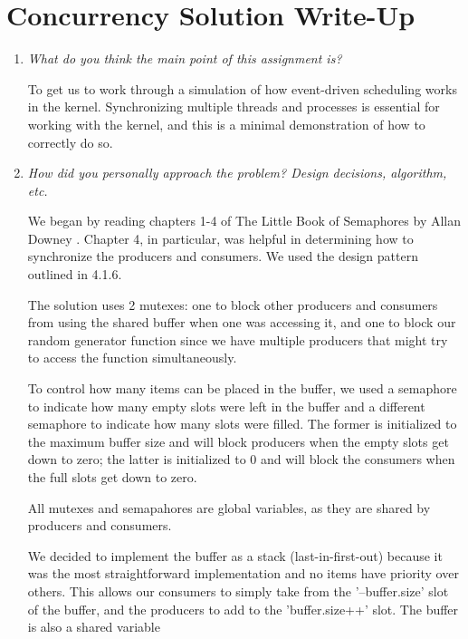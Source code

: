 \documentclass[letterpaper, onecolumn, draftclsnofoot, 10pt, compsoc]{IEEEtran}
\begin{document}
\section{Concurrency Solution Write-Up}
    \begin{singlespace}
    \par
        \begin{enumerate}
            \item \textit{What do you think the main point of this assignment is?}\par
            To get us to work through a simulation of how event-driven scheduling works in the kernel. Synchronizing multiple threads and processes is essential for working with the kernel, and this is a minimal demonstration of how to correctly do so.
            \par
            \item \textit{How did you personally approach the problem? Design decisions, algorithm, etc.}\par
            We began by reading chapters 1-4 of The Little Book of Semaphores by Allan Downey \cite{DowneyBOS}. Chapter 4, in particular, was helpful in determining how to synchronize the producers and consumers. We used the design pattern outlined in 4.1.6.\par
            
            The solution uses 2 mutexes: one to block other producers and consumers from using the shared buffer when one was accessing it, and one to block our random generator function since we have multiple producers that might try to access the function simultaneously.\par
            
            To control how many items can be placed in the buffer, we used a semaphore to indicate how many empty slots were left in the buffer and a different semaphore to indicate how many slots were filled. The former is initialized to the maximum buffer size and will block producers when the empty slots get down to zero; the latter is initialized to 0 and will block the consumers when the full slots get down to zero.
            
            All mutexes and semapahores are global variables, as they are shared by producers and consumers.
            
            We decided to implement the buffer as a stack (last-in-first-out) because it was the most straightforward implementation and no items have priority over others. This allows our consumers to simply take from the '--buffer.size' slot of the buffer, and the producers to add to the 'buffer.size++' slot. The buffer is also a shared variable
            

\end{enumerate}
\end{singlespace}
\end{document}
